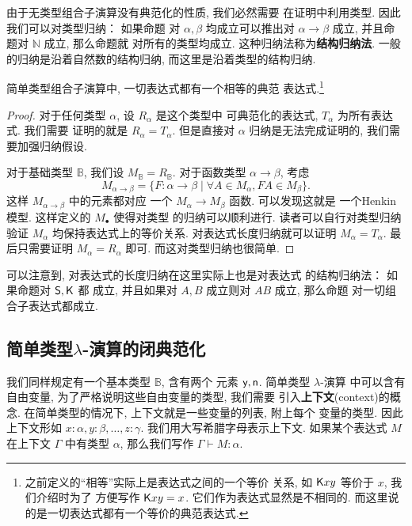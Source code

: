 由于无类型组合子演算没有典范化的性质, 我们必然需要
在证明中利用类型. 因此我们可以对类型归纳： 如果命题
对 \(\alpha,\beta\) 均成立可以推出对 \(\alpha\to\beta\)
成立, 并且命题对 \(\mathbb N\) 成立, 那么命题就
对所有的类型均成立. 这种归纳法称为\textbf{结构归纳法}.
一般的归纳是沿着自然数的结构归纳, 而这里是沿着类型的结构归纳.

\begin{theorem}
简单类型组合子演算中, 一切表达式都有一个相等的典范
表达式.\footnote{之前定义的“相等”实际上是表达式之间的一个等价
关系, 如 \(\textsf{K}xy\) 等价于 \(x\), 我们介绍时为了
方便写作 \(\textsf{K}xy = x\). 它们作为表达式显然是不相同的.
而这里说的是一切表达式都有一个等价的典范表达式.}
\end{theorem}
\begin{proof}
对于任何类型 \(\alpha\), 设 \(R_\alpha\) 是这个类型中
可典范化的表达式, \(T_\alpha\) 为所有表达式. 我们需要
证明的就是 \(R_\alpha = T_\alpha\). 但是直接对 \(\alpha\)
归纳是无法完成证明的, 我们需要加强归纳假设.

对于基础类型 \(\mathbb B\), 我们设 \(M_{\mathbb B} = R_{\mathbb B}\).
对于函数类型 \(\alpha \to \beta\), 考虑
\[M_{\alpha \to \beta} = \{F : \alpha \to \beta \mid
\forall A \in M_\alpha, FA \in M_\beta\}.\]
这样 \(M_{\alpha \to \beta}\) 中的元素都对应
一个 \(M_\alpha \to M_\beta\) 函数. 可以发现这就是
一个Henkin模型. 这样定义的 \(M_\bullet\) 使得对类型
的归纳可以顺利进行. 读者可以自行对类型归纳验证 \(M_\alpha\)
均保持表达式上的等价关系. 对表达式长度归纳就可以证明
\(M_\alpha = T_\alpha\). 最后只需要证明 \(M_\alpha = R_\alpha\)
即可. 而这对类型归纳也很简单.
\end{proof}

可以注意到, 对表达式的长度归纳在这里实际上也是对表达式
的结构归纳法： 如果命题对 \(\textsf{S}, \textsf{K}\) 都
成立, 并且如果对 \(A,B\) 成立则对 \(AB\) 成立, 那么命题
对一切组合子表达式都成立.

\subsection{简单类型\texorpdfstring{\(\lambda\)}{Lambda}-演算的闭典范化}
我们同样规定有一个基本类型 \(\mathbb B\), 含有两个
元素 \(\textsf{y}, \textsf{n}\). 简单类型 \(\lambda\)-演算
中可以含有自由变量, 为了严格说明这些自由变量的类型, 我们需要
引入\textbf{上下文}(context)的概念.
在简单类型的情况下, 上下文就是一些变量的列表, 附上每个
变量的类型. 因此上下文形如 \(x{:}\alpha, y{:}\beta, \dots, z{:}\gamma\).
我们用大写希腊字母表示上下文. 如果某个表达式 \(M\)
在上下文 \(\Gamma\) 中有类型 \(\alpha\),
那么我们写作 \(\Gamma \vdash M : \alpha\).

